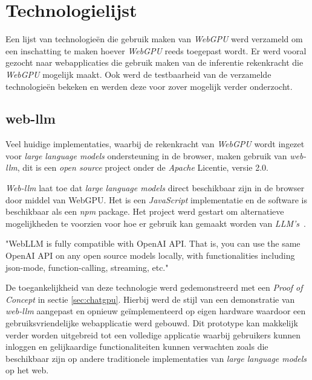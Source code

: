 \chapter{Technologielijst}
\label{ch:technologylist}

Een lijst van technologieën die gebruik maken van \textit{WebGPU} werd verzameld om een inschatting te maken hoever \textit{WebGPU} reeds toegepast wordt. Er werd vooral gezocht naar webapplicaties die gebruik maken van de inferentie rekenkracht die \textit{WebGPU} mogelijk maakt. Ook werd de testbaarheid van de verzamelde technologieën bekeken en werden deze voor zover mogelijk verder onderzocht.

\section{web-llm}

Veel huidige implementaties, waarbij de rekenkracht van \textit{WebGPU} wordt ingezet voor \textit{large language models} ondersteuning in de browser, maken gebruik van \textit{web-llm}, dit is een \textit{open source} project onder de \textit{Apache} Licentie, versie 2.0.

\bigbreak{}

\textit{Web-llm} laat toe dat \textit{large language models} direct beschikbaar zijn in de browser door middel van WebGPU. Het is een \textit{JavaScript} implementatie en de software is beschikbaar als een \textit{npm} package. Het project werd gestart om alternatieve mogelijkheden te voorzien voor hoe er gebruik kan gemaakt worden van \textit{LLM's}~\autocite{mlcai2024}.

\begin{displayquote}
    "WebLLM is fully compatible with OpenAI API. That is, you can use the same OpenAI API on any open source models locally, with functionalities including json-mode, function-calling, streaming, etc."
\end{displayquote}

De toegankelijkheid van deze technologie werd gedemonstreerd met een \textit{Proof of Concept} in sectie \ref{sec:chatgpu}. Hierbij werd de stijl van een demonstratie van \textit{web-llm} aangepast en opnieuw geïmplementeerd op eigen hardware waardoor een ge\-bruiks\-vrien\-de\-lij\-ke webapplicatie werd gebouwd. Dit prototype kan makkelijk verder worden uitgebreid tot een volledige applicatie waarbij gebruikers kunnen inloggen en gelijkaardige functionaliteiten kunnen verwachten zoals die beschikbaar zijn op andere traditionele implementaties van \textit{large language models} op het web.

